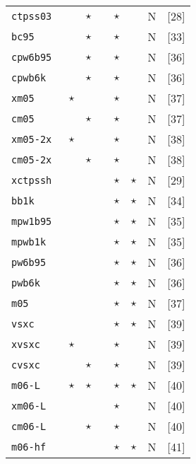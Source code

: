 \begin{table}[htp]
{\begin{tabular}{|l|p{0.12cm}p{0.12cm}cccp{0.35cm}|c|}
{\tt  ctpss03  }&          &  $\star$    &           &$\star$&   &  N   &[28]\\
{\tt  bc95     }&          &  $\star$    &           &$\star$&   &  N   &[33]\\
{\tt  cpw6b95  }&          &  $\star$    &           &$\star$&   &  N   &[36]\\
{\tt  cpwb6k   }&          &  $\star$    &           &$\star$&   &  N   &[36]\\
{\tt  xm05     }& $\star$  &             &           &$\star$&   &  N   &[37]\\
{\tt  cm05     }&          &  $\star$    &           &$\star$&   &  N   &[37]\\
{\tt  xm05-2x  }& $\star$  &             &           &$\star$&   &  N   &[38]\\
{\tt  cm05-2x  }&          &  $\star$    &           &$\star$&   &  N   &[38]\\
{\tt  xctpssh  }&          &             &       &$\star$&$\star$&  N   &[29]\\
{\tt  bb1k     }&          &             &       &$\star$&$\star$&  N   &[34]\\
{\tt  mpw1b95  }&          &             &       &$\star$&$\star$&  N   &[35]\\
{\tt  mpwb1k   }&          &             &       &$\star$&$\star$&  N   &[35]\\
{\tt  pw6b95   }&          &             &       &$\star$&$\star$&  N   &[36]\\
{\tt  pwb6k    }&          &             &       &$\star$&$\star$&  N   &[36]\\
{\tt  m05      }&          &             &       &$\star$&$\star$&  N   &[37]\\
{\tt  vsxc     }&          &             &       &$\star$&$\star$&  N   &[39]\\
{\tt  xvsxc    }& $\star$  &             &       &$\star$&       &  N   &[39]\\
{\tt  cvsxc    }&          & $\star$     &       &$\star$&       &  N   &[39]\\
{\tt  m06-L    }& $\star$  & $\star$     &       &$\star$&$\star$&  N   &[40]\\
{\tt  xm06-L   }&          &             &       &$\star$&       &  N   &[40]\\
{\tt  cm06-L   }&          & $\star$     &       &$\star$&       &  N   &[40]\\
{\tt  m06-hf   }&          &             &       &$\star$&$\star$&  N   &[41]\\

\end{tabular}}
\end{table}
